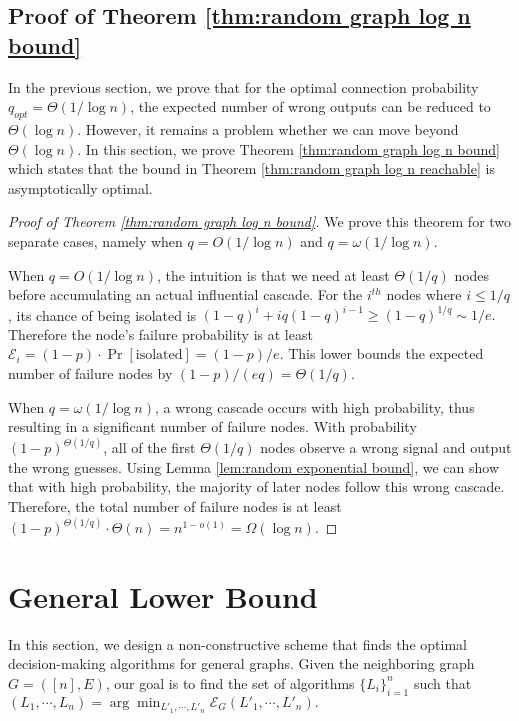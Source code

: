 \documentclass[a4paper,UKenglish]{lipics}
\newtheorem{thm}{Theorem}[section] %
\theoremstyle{definition}
\begin{document}
\subsection {Proof of Theorem \ref{thm:random graph log n bound}}
In the previous section, we prove that for the optimal connection probability $q_{opt} = \Theta(1 / \log n)$, the expected number of wrong outputs can be reduced to $\Theta(\log n)$. 
However, it remains a problem whether we can move beyond $\Theta(\log n)$. In this section, we prove Theorem \ref{thm:random graph log n bound} which states that the bound in Theorem \ref{thm:random graph log n reachable} is asymptotically optimal.

\begin{proof}[Proof of Theorem \ref{thm:random graph log n bound}]

We prove this theorem for two separate cases, namely when $q = O(1 / \log n)$ and $q = \omega(1 / \log n)$. 

When $q = O(1 / \log n)$, the intuition is that we need at least $\Theta(1/q)$ nodes before accumulating an actual influential cascade.
For the $i^{th}$ nodes where $i \le 1/q$, its chance of being isolated is 
$
	(1 - q)^{i} + iq(1-q)^{i-1}
\ge
	(1 - q)^{1 / q}
\sim
	{1 / e}.
$
Therefore the node's failure probability is at least $\mathcal{E}_i = (1-p)\cdot\Pr[\text{isolated}] = (1-p)/e$.
This lower bounds the expected number of failure nodes by $(1-p)/(eq) = \Theta(1/q)$.

When $q = \omega(1 / \log n)$, 
	a wrong cascade occurs with high probability,
	thus resulting in a significant number of failure nodes.
With probability $(1-p)^{\Theta(1/q)}$, all of the first $\Theta(1/q)$ nodes observe a wrong signal and output the wrong guesses.
Using Lemma \ref{lem:random exponential bound}, we can show that with high probability, the majority of later nodes follow this wrong cascade.
Therefore, the total number of failure nodes is at least
$
(1-p)^{\Theta(1/q)}\cdot \Theta(n) = n^{1 - o(1)} = \Omega(\log n).
$
\end{proof}









\section{General Lower Bound}
In this section, we design a non-constructive scheme that finds the optimal decision-making algorithms for general graphs.
Given the neighboring graph $G = ([n], E)$, our goal is to find the set of algorithms $\{L_i\}_{i=1}^{n}$ such that
$
	(L_1, \dotsb, L_n)
=
	\arg\min_{L'_1, \dotsb, L'_n} \mathcal{E}_{G}(L'_1,\dotsb, L'_n).
$
\end{document}
